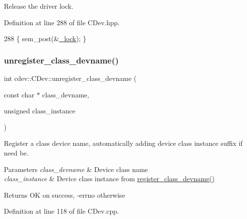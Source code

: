 Release the driver lock. 

Definition at line 288 of file C\+Dev.\+hpp.


\begin{DoxyCode}
288 \{ sem\_post(&\hyperlink{classcdev_1_1CDev_aa9b327dcb42b1160c01417ad64cd8e2b}{\_lock}); \}
\end{DoxyCode}
\mbox{\label{classcdev_1_1CDev_a84f73216813a23f91cd9414262484f3f}} 
\subsubsection{\texorpdfstring{unregister\+\_\+class\+\_\+devname()}{unregister\_class\_devname()}}
{\footnotesize\ttfamily int cdev\+::\+C\+Dev\+::unregister\+\_\+class\+\_\+devname (\begin{DoxyParamCaption}\item[{const char $\ast$}]{class\+\_\+devname,  }\item[{unsigned}]{class\+\_\+instance }\end{DoxyParamCaption})\hspace{0.3cm}{\ttfamily [protected]}}

Register a class device name, automatically adding device class instance suffix if need be.


\begin{DoxyParams}{Parameters}
{\em class\+\_\+devname} & Device class name \\
\hline
{\em class\+\_\+instance} & Device class instance from \hyperlink{classcdev_1_1CDev_a8cdc695d86a00139e11b2d57974475b4}{register\+\_\+class\+\_\+devname()} \\
\hline
\end{DoxyParams}
\begin{DoxyReturn}{Returns}
OK on success, -\/errno otherwise 
\end{DoxyReturn}


Definition at line 118 of file C\+Dev.\+cpp.


\mbox{\label{classcdev_1_1CDev_a9fe9c784053bc2b7748db1ec405ae83f}} 
